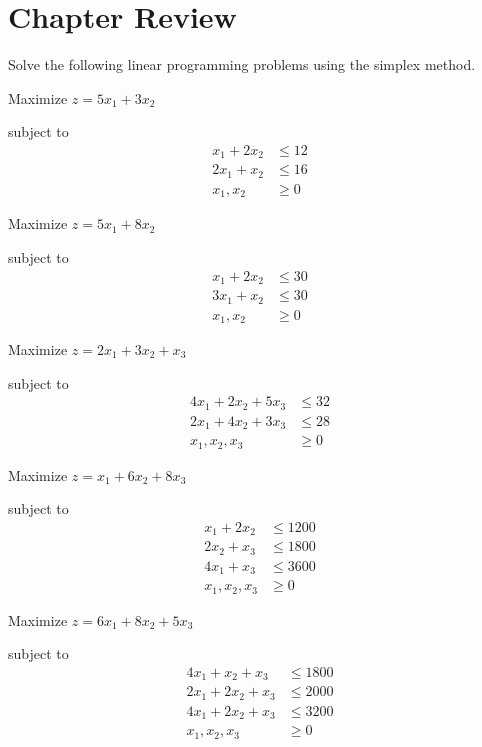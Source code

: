 \section{Chapter Review}

Solve the following linear programming problems using the simplex method.


\begin{puzzle}
    Maximize \( z = 5x_1 + 3x_2 \)

    subject to
    \begin{align*}
        x_1 + 2x_2 & \leq 12 \\
        2x_1 + x_2 & \leq 16 \\
        x_1, x_2   & \geq 0
    \end{align*}
\end{puzzle}

\begin{puzzle}
    Maximize \( z = 5x_1 + 8x_2 \)

    subject to
    \begin{align*}
        x_1 + 2x_2 & \leq 30 \\
        3x_1 + x_2 & \leq 30 \\
        x_1, x_2   & \geq 0
    \end{align*}
\end{puzzle}

\begin{puzzle}
    Maximize \( z = 2x_1 + 3x_2 + x_3 \)

    subject to
    \begin{align*}
        4x_1 + 2x_2 + 5x_3 & \leq 32 \\
        2x_1 + 4x_2 + 3x_3 & \leq 28 \\
        x_1, x_2, x_3      & \geq 0
    \end{align*}
\end{puzzle}

\begin{puzzle}
    Maximize \( z = x_1 + 6x_2 + 8x_3 \)

    subject to
    \begin{align*}
        x_1 + 2x_2    & \leq 1200 \\
        2x_2 + x_3    & \leq 1800 \\
        4x_1 + x_3    & \leq 3600 \\
        x_1, x_2, x_3 & \geq 0
    \end{align*}
\end{puzzle}

\begin{puzzle}
    Maximize \( z = 6x_1 + 8x_2 + 5x_3 \)

    subject to
    \begin{align*}
        4x_1 + x_2 + x_3  & \leq 1800 \\
        2x_1 + 2x_2 + x_3 & \leq 2000 \\
        4x_1 + 2x_2 + x_3 & \leq 3200 \\
        x_1, x_2, x_3     & \geq 0
    \end{align*}
\end{puzzle}


